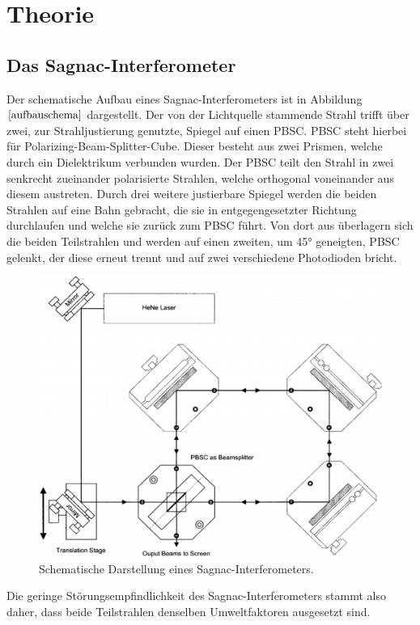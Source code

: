 \section{Theorie}
\subsection{Das Sagnac-Interferometer}
Der schematische Aufbau eines Sagnac-Interferometers ist in Abbildung $\ref{aufbauschema}$ dargestellt.
Der von der Lichtquelle stammende Strahl trifft über zwei, zur Strahljustierung genutzte,
Spiegel auf einen PBSC. PBSC steht hierbei für  Polarizing-Beam-Splitter-Cube. Dieser besteht aus zwei Prismen, welche durch ein
Dielektrikum verbunden wurden. Der PBSC teilt den Strahl in zwei senkrecht zueinander
polarisierte Strahlen, welche orthogonal voneinander aus diesem austreten. Durch drei weitere justierbare Spiegel werden die beiden Strahlen auf eine Bahn gebracht, die sie in entgegengesetzter Richtung durchlaufen
und welche sie zurück zum PBSC führt. Von dort aus überlagern sich die beiden Teilstrahlen und werden auf einen zweiten, um 45° geneigten, PBSC gelenkt, der diese erneut trennt
und auf zwei verschiedene Photodioden bricht.
\begin{figure}[H]
  \centering
  \includegraphics[scale=0.4]{Bilder/schema.png}
  \caption{Schematische Darstellung eines Sagnac-Interferometers.\cite{anleitung}}
  \label{aufbauschema}
\end{figure}
Die geringe Störungsempfindlichkeit des Sagnac-Interferometers stammt also daher, dass beide Teilstrahlen denselben Umweltfaktoren ausgesetzt sind.
